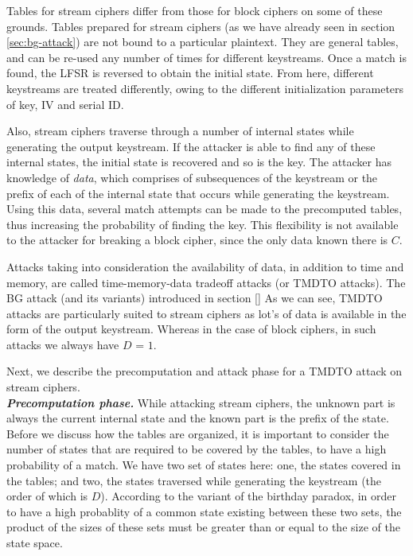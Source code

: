 Tables for stream ciphers differ from those for block ciphers on some of these grounds. Tables prepared for stream ciphers (as we have already seen in section \ref{sec:bg-attack}) are not bound to a particular plaintext. They are general tables, and can be re-used any number of times for different keystreams. Once a match is found, the LFSR is reversed to obtain the initial state. From here, different keystreams are treated differently, owing to the different initialization parameters of key, IV and serial ID.

Also, stream ciphers traverse through a number of internal states while generating the output keystream. If the attacker is able to find any of these internal states, the initial state is recovered and so is the key. The attacker has knowledge of \emph{data}, which comprises of subsequences of the keystream or the prefix of each of the internal state that occurs while generating the keystream. Using this data, several match attempts can be made to the precomputed tables, thus increasing the probability of finding the key. This flexibility is not available to the attacker for breaking a block cipher, since the only data known there is $C$. 

Attacks taking into consideration the availability of data, in addition to time and memory, are called time-memory-data tradeoff attacks (or TMDTO attacks). The BG attack (and its variants) introduced in section \ref{} As we can see, TMDTO attacks are particularly suited to stream ciphers as lot's of data is available in the form of the output keystream. Whereas in the case of block ciphers, in such attacks we always have $D$ = $1$. 

Next, we describe the precomputation and attack phase for a TMDTO attack on stream ciphers.\\

\noindent \textit{\textbf{Precomputation phase.}} While attacking stream ciphers, the unknown part is always the current internal state and the known part is the prefix of the state. Before we discuss how the tables are organized, it is important to consider the number of states that are required to be covered by the tables, to have a high probability of a match. We have two set of states here: one, the states covered in the tables; and two, the states traversed while generating the keystream (the order of which is $D$). According to the variant of the birthday paradox, in order to have a high probablity of a common state existing between these two sets, the product of the sizes of these sets must be greater than or equal to the size of the state space. 

